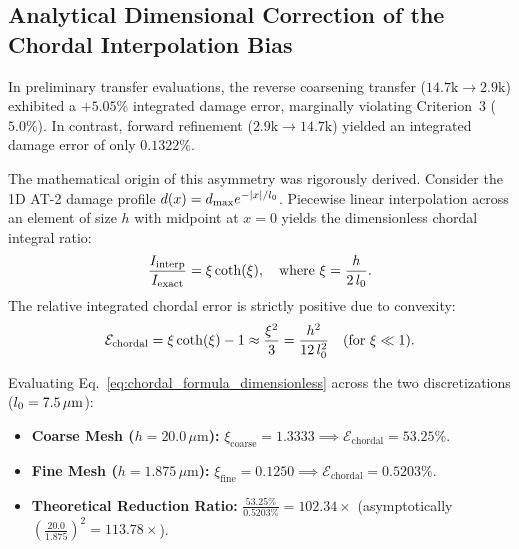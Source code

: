 \begin{center}
\end{center}

\subsection{Analytical Dimensional Correction of the Chordal Interpolation Bias}
\label{subsec:method_c_chordal_bias_correction}

In preliminary transfer evaluations, the reverse coarsening transfer ($14.7\mathrm{k} \to 2.9\mathrm{k}$) exhibited a $+5.05\%$ integrated damage error, marginally violating Criterion~3 ($5.0\%$). In contrast, forward refinement ($2.9\mathrm{k} \to 14.7\mathrm{k}$) yielded an integrated damage error of only $0.1322\%$.

The mathematical origin of this asymmetry was rigorously derived. Consider the 1D AT-2 damage profile $d(x) = d_{\max} e^{-|x|/l_0}$. Piecewise linear interpolation across an element of size $h$ with midpoint at $x=0$ yields the dimensionless chordal integral ratio:
\begin{equation}
  \frac{I_{\mathrm{interp}}}{I_{\mathrm{exact}}} = \xi \coth(\xi), \quad \text{where } \xi = \frac{h}{2\,l_0}.
  \label{eq:chordal_formula_dimensionless}
\end{equation}
The relative integrated chordal error is strictly positive due to convexity:
\begin{equation}
  \mathcal{E}_{\mathrm{chordal}} = \xi \coth(\xi) - 1 \approx \frac{\xi^2}{3} = \frac{h^2}{12\,l_0^2} \quad (\text{for } \xi \ll 1).
  \label{eq:chordal_taylor_expansion}
\end{equation}

Evaluating Eq.~\eqref{eq:chordal_formula_dimensionless} across the two discretizations ($l_0 = 7.5\,\mu\mathrm{m}$):
\begin{itemize}
  \item \textbf{Coarse Mesh ($h = 20.0\,\mu\mathrm{m}$):} $\xi_{\mathrm{coarse}} = 1.3333 \implies \mathcal{E}_{\mathrm{chordal}} = 53.25\%$.
  \item \textbf{Fine Mesh ($h = 1.875\,\mu\mathrm{m}$):} $\xi_{\mathrm{fine}} = 0.1250 \implies \mathcal{E}_{\mathrm{chordal}} = 0.5203\%$.
  \item \textbf{Theoretical Reduction Ratio:} $\frac{53.25\%}{0.5203\%} = 102.34\times$ (asymptotically $\left(\frac{20.0}{1.875}\right)^2 = 113.78\times$).
\end{itemize}

